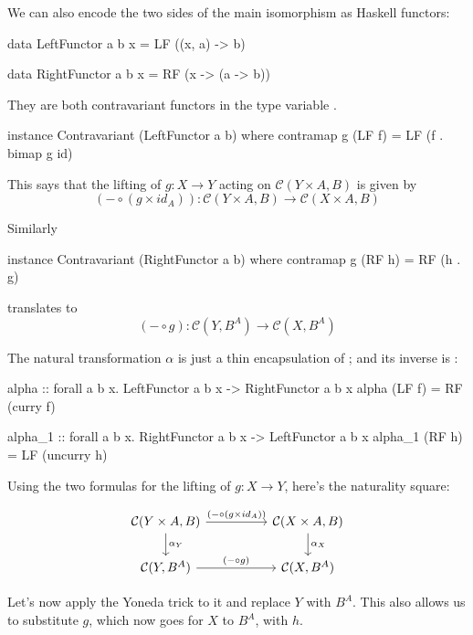 \documentclass[DaoFP]{subfiles}
\begin{document}
We can also encode the two sides of the main isomorphism as Haskell functors:
\begin{haskell}
data LeftFunctor  a b x = LF ((x, a) -> b)
\end{haskell}
\begin{haskell}
data RightFunctor a b x = RF (x -> (a -> b))
\end{haskell}
They are both contravariant functors in the type variable .
\begin{haskell}
instance Contravariant (LeftFunctor a b) where
  contramap g (LF f) = LF (f . bimap g id)
\end{haskell}
This says that the lifting of $g \colon X \to Y$ acting on $ \mathcal{C}(Y \times A, B)$ is given by
\[ (- \circ (g \times id_A)) \colon\mathcal{C}(Y \times A, B) \to  \mathcal{C}(X \times A, B)\]

Similarly
\begin{haskell}
instance Contravariant (RightFunctor a b) where
  contramap g (RF h) = RF (h . g)
\end{haskell}
translates to 
\[ (- \circ g) \colon  \mathcal{C}(Y, B^A) \to \mathcal{C}(X, B^A) \]

The natural transformation $\alpha$ is just a thin encapsulation of ; and its inverse is :

\begin{haskell}
alpha :: forall a b x. LeftFunctor a b x -> RightFunctor a b x
alpha (LF f) = RF (curry f)
\end{haskell}

\begin{haskell}
alpha_1 :: forall a b x. RightFunctor a b x -> LeftFunctor a b x
alpha_1 (RF h) = LF (uncurry h)
\end{haskell}

Using the two formulas for the lifting of $g \colon X \to Y$, here's the naturality square:

\[
 \begin{tikzcd}
 \mathcal{C}(Y \times A, B)
 \arrow[rr, "(- \circ (g \times id_A))"]
 \arrow[d,  "\alpha_Y"]
& &
\mathcal{C}(X \times A, B)
  \arrow[d, "\alpha_X"]
 \\
 \mathcal{C}(Y, B^A)
 \arrow[rr, "(- \circ g)"]
& &
\mathcal{C}(X, B^A)
 \end{tikzcd}
\]

Let's now apply the Yoneda trick to it and replace $Y$ with $B^A$. This also allows us to substitute $g$, which now goes for $X$ to $B^A$, with $h$. 
\end{document}
